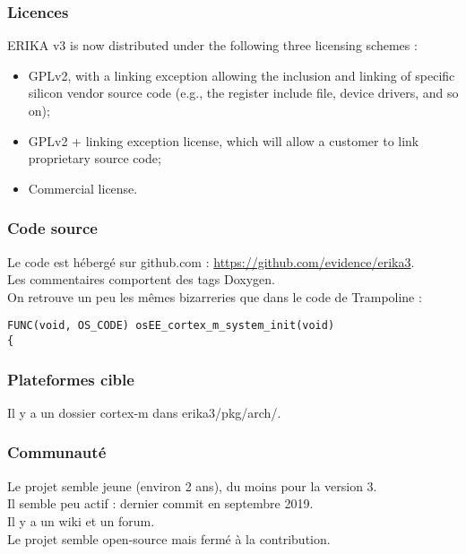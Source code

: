 \subsubsection{Licences}
ERIKA v3 is now distributed under the following three licensing schemes :
\begin{itemize}
	\item GPLv2, with a linking exception allowing the inclusion and linking of
			specific silicon vendor source code (e.g., the register include file, device
			drivers, and so on);
	\item GPLv2 + linking exception license, which will allow a customer to link
			proprietary source code;
	\item Commercial license.
\end{itemize}

\subsubsection{Code source}
Le code est hébergé sur github.com :
\url{https://github.com/evidence/erika3}.\\

Les commentaires comportent des tags Doxygen.\\

On retrouve un peu les mêmes bizarreries que dans le code de Trampoline :
\begin{verbatim}
FUNC(void, OS_CODE) osEE_cortex_m_system_init(void)
{
\end{verbatim}


\subsubsection{Plateformes cible}
Il y a un dossier cortex-m dans erika3/pkg/arch/.


\subsubsection{Communauté}
Le projet semble jeune (environ 2 ans), du moins pour la version 3.\\

Il semble peu actif : dernier commit en septembre 2019.\\

Il y a un wiki et un forum.\\

Le projet semble open-source mais fermé à la contribution.\\

